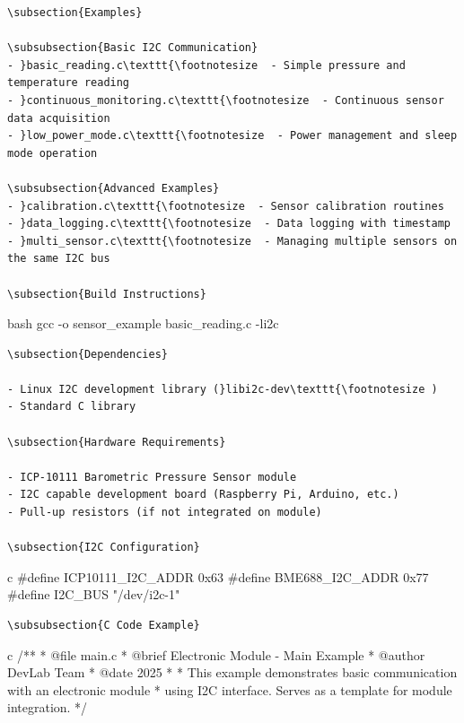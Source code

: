 \documentclass[11pt,a4paper]{article}
\begin{document}
\begin{lstlisting}[language=text]
\subsection{Examples}

\subsubsection{Basic I2C Communication}
- }basic_reading.c\texttt{\footnotesize  - Simple pressure and temperature reading
- }continuous_monitoring.c\texttt{\footnotesize  - Continuous sensor data acquisition
- }low_power_mode.c\texttt{\footnotesize  - Power management and sleep mode operation

\subsubsection{Advanced Examples}
- }calibration.c\texttt{\footnotesize  - Sensor calibration routines
- }data_logging.c\texttt{\footnotesize  - Data logging with timestamp
- }multi_sensor.c\texttt{\footnotesize  - Managing multiple sensors on the same I2C bus

\subsection{Build Instructions}
\end{lstlisting}bash
gcc -o sensor_example basic_reading.c -li2c
\begin{lstlisting}[language=text]
\subsection{Dependencies}

- Linux I2C development library (}libi2c-dev\texttt{\footnotesize )
- Standard C library

\subsection{Hardware Requirements}

- ICP-10111 Barometric Pressure Sensor module
- I2C capable development board (Raspberry Pi, Arduino, etc.)
- Pull-up resistors (if not integrated on module)

\subsection{I2C Configuration}
\end{lstlisting}c
#define ICP10111_I2C_ADDR    0x63
#define BME688_I2C_ADDR      0x77
#define I2C_BUS              "/dev/i2c-1"
\begin{lstlisting}[language=text]
\subsubsection{C Code Example}
\end{lstlisting}c
/**
 * @file main.c
 * @brief Electronic Module - Main Example
 * @author DevLab Team
 * @date 2025
 * 
 * This example demonstrates basic communication with an electronic module
 * using I2C interface. Serves as a template for module integration.
 */
\end{document}
